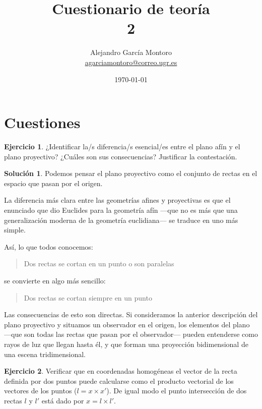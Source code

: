 \documentclass[a4paper, 11pt]{article}
\title{Cuestionario de teoría \\ 2}
\author{Alejandro García Montoro\\
    \href{mailto:agarciamontoro@correo.ugr.es}{agarciamontoro@correo.ugr.es}}
\date{\today}
\theoremstyle{definition}
\newtheorem{ejercicio}{Ejercicio}
\newtheorem*{solucion}{Solución}
\theoremstyle{theorem}
\begin{document}
  \maketitle

  \section{Cuestiones}

  \begin{ejercicio}
      ¿Identificar la/s diferencia/s esencial/es entre el plano afín y el plano proyectivo? ¿Cuáles son sus consecuencias? Justificar la contestación.
  \end{ejercicio}

  \begin{solucion}
      Podemos pensar el plano proyectivo como el conjunto de rectas en el espacio que pasan por el origen.

      La diferencia más clara entre las geometrías afines y proyectivas es que el enunciado que dio Euclides para la geometría afín ---que no es más que una generalización moderna de la geometría euclidiana--- se traduce en uno más simple.

      Así, lo que todos conocemos:
      \begin{quote}
          Dos rectas se cortan en un punto o son paralelas
      \end{quote}
      se convierte en algo más sencillo:
      \begin{quotation}
          Dos rectas se cortan siempre en un punto
      \end{quotation}

      Las consecuencias de esto son directas. Si consideramos la anterior descripción del plano proyectivo y situamos un observador en el origen, los elementos del plano ---que son todas las rectas que pasan por el observador--- pueden entenderse como rayos de luz que llegan hasta él, y que forman una proyección bidimensional de una escena tridimensional.
  \end{solucion}

  \begin{ejercicio}
      Verificar que en coordenadas homogéneas el vector de la recta definida por dos puntos puede calcularse como el producto vectorial de los vectores de los puntos ($l = x \times x'$). De igual modo el punto intersección de dos rectas $l$ y $l'$ está dado por $x = l \times l'$.
  \end{ejercicio}
\end{document}
